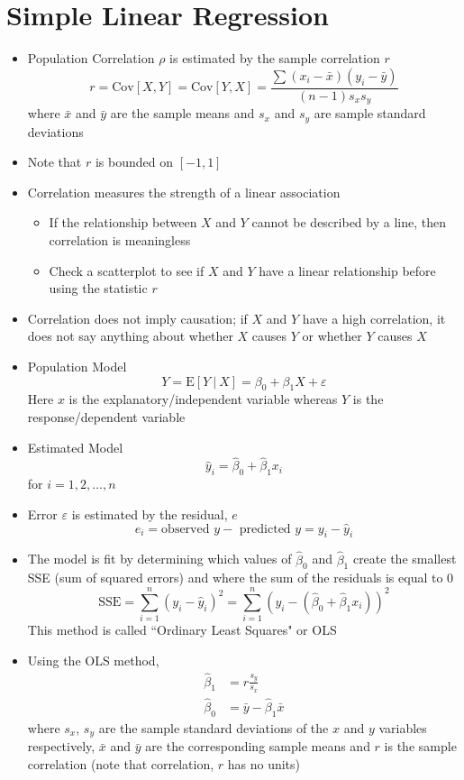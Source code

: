 \documentclass[12pt]{article}
\begin{document}
\section{Simple Linear Regression}
\begin{itemize}
\item Population Correlation $\rho$ is estimated by the sample correlation $r$
$$ r = \text{Cov}[X,Y] = \text{Cov}[Y,X] = \frac{\sum (x_i - \bar{x})(y_i - \bar{y})}{(n-1)s_xs_y} $$ where $\bar{x}$ and $\bar{y}$ are the sample means and $s_x$ and $s_y$ are sample standard deviations 
\item Note that $r$ is bounded on $[-1,1]$
\item Correlation measures the strength of a linear association \begin{itemize} 
\item If the relationship between $X$ and $Y$ cannot be described by a line, then correlation is meaningless 
\item Check a scatterplot to see if $X$ and $Y$ have a linear relationship before using the statistic $r$ \end{itemize} 
\item Correlation does not imply causation; if $X$ and $Y$ have a high correlation, it does not say anything about whether $X$ causes $Y$ or whether $Y$ causes $X$ 
\item Population Model $$ Y = \text{E}[Y~|~X] = \beta_0 + \beta_1X+\varepsilon $$ 
Here $x$ is the explanatory/independent variable whereas $Y$ is the response/dependent variable 
\item Estimated Model $$ \hat{y}_i = \hat{\beta}_0 + \hat{\beta}_1x_i $$ for $i = 1,2,\dots,n$
\item Error $\varepsilon$ is estimated by the residual, $e$
$$ e_i = \text{observed } y - \text{ predicted } y = y_i - \hat{y}_i $$ 
\item The model is fit by determining which values of $\hat{\beta}_0$ and $\hat{\beta}_1$ create the smallest SSE (sum of squared errors) and where the sum of the residuals is equal to $0$ 
$$ \text{SSE} = \sum_{i=1}^n (y_i - \hat{y}_i)^2 = \sum_{i=1}^n \left(y_i - (\hat{\beta}_0 + \hat{\beta}_1x_i) \right)^2 $$ This method is called ``Ordinary Least Squares" or OLS 
\item Using the OLS method, $$ \begin{aligned} 
\hat{\beta}_1 &= r\frac{s_y}{s_x} \\ \hat{\beta}_0 &= \bar{y} - \hat{\beta}_1\bar{x} \end{aligned} $$ where $s_x$, $s_y$ are the sample standard deviations of the $x$ and $y$ variables respectively, $\bar{x}$ and $\bar{y}$ are the corresponding sample means and $r$ is the sample correlation (note that correlation, $r$ has no units) 

\end{itemize}
\end{document}
